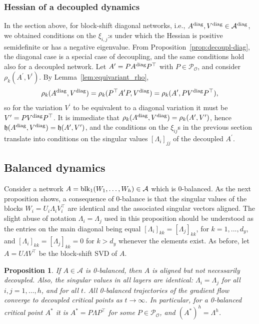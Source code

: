 \documentclass{article}
\newtheorem{proposition}{Proposition}
\def\diag{{\rm diag}}
\def\block{{\rm blk}}
\newcommand{\1}{\mathds{1}}
\begin{document}
\subsubsection{Hessian of a decoupled dynamics}

In the section above, for block-shift diagonal networks, i.e., $ A^\diag, V^\diag \in \mathcal{ A }^\diag $, we obtained conditions on the $\xi_{i,j}$:s under which the Hessian is positive semidefinite or has a negative eigenvalue. From Proposition~\ref{prop:decoupl-diag}, the diagonal case is a special case of decoupling, and the same conditions hold also for a decoupled network. Let $ A^\prime = P A^\diag P^\top $ with $ P \in \mathcal{P_O} $, and consider $ \rho_k(A^\prime,V^\prime) $. By Lemma~\ref{lem:equivariant_rho},
\[
\rho_k(A^\diag, V^\diag ) = \rho_k(P^\top A^\prime P, V^\diag) = \rho_k(A^\prime , P V^\diag P^\top),
\]
so for the variation $ V^\prime $ to be equivalent to a diagonal variation it must be $ V^\prime = P V^\diag P^\top $. It is immediate that $ \rho_k(A^\diag, V^\diag ) = \rho_k(A^\prime,V^\prime) $, hence $ \mathfrak{h}(A^\diag, V^\diag ) = \mathfrak{h}(A^\prime,V^\prime) $, and the conditions on the $\xi_{ij}$s in the previous section translate into conditions on the singular values $[\Lambda_{i}]_{jj}$ of the decoupled $A^\prime$.

\subsection{Balanced dynamics}
\label{sec:balance}


Consider a network $ A =\block_1(W_1, \ldots, W_h)\in \mathcal{ A } $ which is 0-balanced.
As the next proposition shows, a consequence of 0-balance is that the singular values of the blocks $ W_i = U_i \Lambda_i V_i^\top $ are identical and the associated singular vectors aligned. The slight abuse of notation $ \Lambda_i = \Lambda_j $ used in this proposition should be understood as the entries on the main diagonal being equal $ [\Lambda_i]_{kk} = [\Lambda_j]_{kk} $, for $ k = 1,..., d_y $, and $ [\Lambda_i]_{kk} = [\Lambda_j]_{kk} = 0 $ for $ k > d_y $ whenever the elements exist.
As before, let $ A = U \Lambda V^\top$ be the block-shift SVD of $A$.



\begin{proposition}
\label{prop:0-balanced}
If $ A \in \mathcal{ A } $ is 0-balanced, then $A$ is aligned but not necessarily decoupled.
Also, the singular values in all layers are identical: $ \Lambda_i = \Lambda_j$ for all $ i, j= 1, \ldots, h$, and for all $t$.
 All 0-balanced trajectories of the gradient flow converge to decoupled critical points as $ t \rightarrow \infty $.
In particular, for a 0-balanced critical point $A^\ast $ it is  $A^\ast = P \Lambda P^\top  $ for some $ P\in \mathcal{P_O}$, and $ (A^\ast)^h =\Lambda^h$.
\end{proposition}
\end{document}
